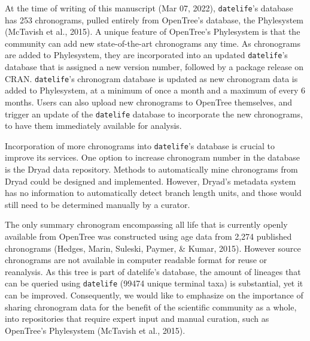 \documentclass[
  english,
  man]{apa6}
\begin{document}
At the time of writing of this manuscript (Mar 07, 2022), \texttt{datelife}'s database has 253 chronograms, pulled entirely from OpenTree's database, the Phylesystem (McTavish et al., 2015). A unique feature of OpenTree's Phylesystem is that the community can add new state-of-the-art chronograms any time. As chronograms are added to Phylesystem, they are incorporated into an updated \texttt{datelife}'s database that is assigned a new version number, followed by a package release on CRAN. \texttt{datelife}'s chronogram database is updated as new chronogram data is added to Phylesystem, at a minimum of once a month and a maximum of every 6 months.
Users can also upload new chronograms to OpenTree themselves, and trigger an update of the \texttt{datelife} database to incorporate the new chronograms, to have them immediately available for analysis.

Incorporation of more chronograms into \texttt{datelife}'s database is crucial to improve its services. One option to increase chronogram number in the database is the Dryad data repository. Methods to automatically mine chronograms from Dryad could be designed and implemented. However, Dryad's metadata system has no information to automatically detect branch length units, and those would still need to be determined manually by a curator.

The only summary chronogram encompassing all life that is currently openly available from OpenTree
was constructed using age data from 2,274 published chronograms (Hedges, Marin, Suleski, Paymer, \& Kumar, 2015). However source chronograms are not available in computer readable format for reuse or reanalysis. As this tree is part of datelife's database, the amount of lineages that can be queried using \texttt{datelife} (99474 unique terminal taxa) is substantial, yet it can be improved.
Consequently, we would like to emphasize on the importance of sharing chronogram data for the benefit of the scientific community as a whole, into repositories that require expert input and manual curation, such as OpenTree's Phylesystem (McTavish et al., 2015).
\end{document}
